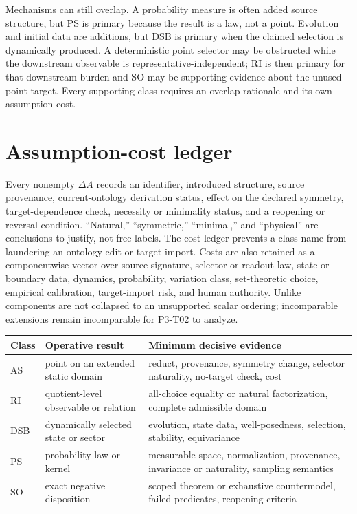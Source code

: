 \documentclass[11pt]{article}
\begin{document}
Mechanisms can still overlap.  A probability measure is often added source
structure, but PS is primary because the result is a law, not a point.
Evolution and initial data are additions, but DSB is primary when the claimed
selection is dynamically produced.  A deterministic point selector may be
obstructed while the downstream observable is representative-independent; RI
is then primary for that downstream burden and SO may be supporting evidence
about the unused point target.  Every supporting class requires an overlap
rationale and its own assumption cost.

\section{Assumption-cost ledger}

Every nonempty $\Delta A$ records an identifier, introduced structure, source
provenance, current-ontology derivation status, effect on the declared
symmetry, target-dependence check, necessity or minimality status, and a
reopening or reversal condition.  ``Natural,'' ``symmetric,'' ``minimal,''
and ``physical'' are conclusions to justify, not free labels.  The cost ledger
prevents a class name from laundering an ontology edit or target import.
Costs are also retained as a componentwise vector over source signature,
selector or readout law, state or boundary data, dynamics, probability,
variation class, set-theoretic choice, empirical calibration, target-import
risk, and human authority.  Unlike components are not collapsed to an
unsupported scalar ordering; incomparable extensions remain incomparable for
P3-T02 to analyze.

\begin{center}
\begin{longtable}{>{\raggedright\arraybackslash}p{}
                  >{\raggedright\arraybackslash}p{}
                  >{\raggedright\arraybackslash}p{}}
\toprule
Class & Operative result & Minimum decisive evidence \\
\midrule
AS & point on an extended static domain & reduct, provenance, symmetry change,
selector naturality, no-target check, cost \\
RI & quotient-level observable or relation & all-choice equality or natural
factorization, complete admissible domain \\
DSB & dynamically selected state or sector & evolution, state data,
well-posedness, selection, stability, equivariance \\
PS & probability law or kernel & measurable space, normalization, provenance,
invariance or naturality, sampling semantics \\
SO & exact negative disposition & scoped theorem or exhaustive countermodel,
failed predicates, reopening criteria \\
\bottomrule
\end{longtable}
\end{center}
\end{document}
